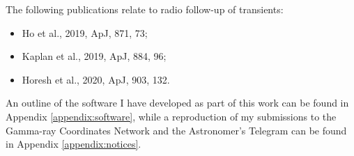The following publications relate to radio follow-up of transients:
\begin{itemize}
    \setlength\itemsep{0.5em}
    \item[] Ho et al., 2019, ApJ, 871, 73;
    \item[] Kaplan et al., 2019, ApJ, 884, 96;
    \item[] Horesh et al., 2020, ApJ, 903, 132.
\end{itemize}

An outline of the software I have developed as part of this work can be found in Appendix \ref{appendix:software}, while a reproduction of my submissions to the Gamma-ray Coordinates Network and the Astronomer's Telegram can be found in Appendix \ref{appendix:notices}.

\nocite{2020arXiv200602382M,2020arXiv200611306K,2020arXiv200613952H,2020MNRAS.494.2449D,2020ApJ...890..131A,2019ApJ...887L..13D,2019ApJ...884...96K,2019PASA...36...19D,2019ApJ...871...73H,2018ApJ...868L..11M,2018ApJ...858L..15D,2018Natur.554..207M,2017PASA...34...69A,2017Sci...358.1579H,2017Sci...358.1559K,2017ApJ...848L..12A}